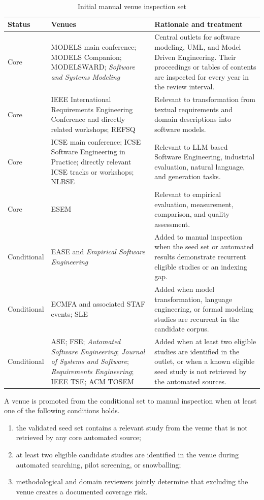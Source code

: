 \begin{table}[htbp]
\centering
\scriptsize
\caption{Initial manual venue inspection set}
\label{tab:protocol_manual_venues}
\begin{tabularx}{\textwidth}{p{} p{} X}
\toprule
\textbf{Status} & \textbf{Venues} & \textbf{Rationale and treatment} \\
\midrule
Core & MODELS main conference; MODELS Companion; MODELSWARD; \emph{Software and Systems Modeling} & Central outlets for software modeling, UML, and Model Driven Engineering. Their proceedings or tables of contents are inspected for every year in the review interval. \\
Core & IEEE International Requirements Engineering Conference and directly related workshops; REFSQ & Relevant to transformation from textual requirements and domain descriptions into software models. \\
Core & ICSE main conference; ICSE Software Engineering in Practice; directly relevant ICSE tracks or workshops; NLBSE & Relevant to LLM based Software Engineering, industrial evaluation, natural language, and generation tasks. \\
Core & ESEM & Relevant to empirical evaluation, measurement, comparison, and quality assessment. \\
Conditional & EASE and \emph{Empirical Software Engineering} & Added to manual inspection when the seed set or automated results demonstrate recurrent eligible studies or an indexing gap. \\
Conditional & ECMFA and associated STAF events; SLE & Added when model transformation, language engineering, or formal modeling studies are recurrent in the candidate corpus. \\
Conditional & ASE; FSE; \emph{Automated Software Engineering}; \emph{Journal of Systems and Software}; \emph{Requirements Engineering}; IEEE TSE; ACM TOSEM & Added when at least two eligible studies are identified in the outlet, or when a known eligible seed study is not retrieved by the automated sources. \\
\bottomrule
\end{tabularx}
\end{table}

A venue is promoted from the conditional set to manual inspection when at least one of the following conditions holds.

\begin{enumerate}[label=\alph*)]
    \item the validated seed set contains a relevant study from the venue that is not retrieved by any core automated source;
    \item at least two eligible candidate studies are identified in the venue during automated searching, pilot screening, or snowballing;
    \item methodological and domain reviewers jointly determine that excluding the venue creates a documented coverage risk.
\end{enumerate}

